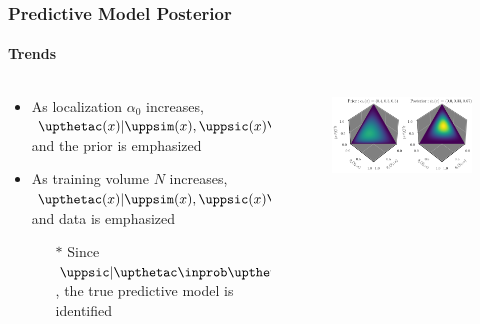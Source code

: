 \documentclass[aspectratio=169]{beamer}
\begin{document}
\begin{frame}
\frametitle{Predictive Model Posterior}
\framesubtitle{Trends}

\begin{columns}[c]

\begin{column}{.5\linewidth}

\begin{itemize}
\item As localization $\alpha_0$ increases, $\upthetac(x) | \uppsim(x),\uppsic(x) \inprob  \alphac(\xrm)$ and the prior is emphasized
\vspace{1em}
\item As training volume $N$ increases, $\upthetac(x) | \uppsim(x),\uppsic(x) \inprob \uppsic(x)$ and data is emphasized
\begin{itemize}
\item[$*$] Since $\uppsic | \upthetac \inprob \upthetac$, the true predictive model is \alert{identified}
\end{itemize}
\end{itemize}


\end{column}

\begin{column}{.5\linewidth}

\begin{figure}
\centering
\includegraphics[width=1\linewidth]{SSP_2021/presentation/prior_post_h.png}
\label{fig:P_theta_post_uni}
\end{figure}

\end{column}

\end{columns}


\vspace{1em}

\centering
{}

\end{frame}
\end{document}
